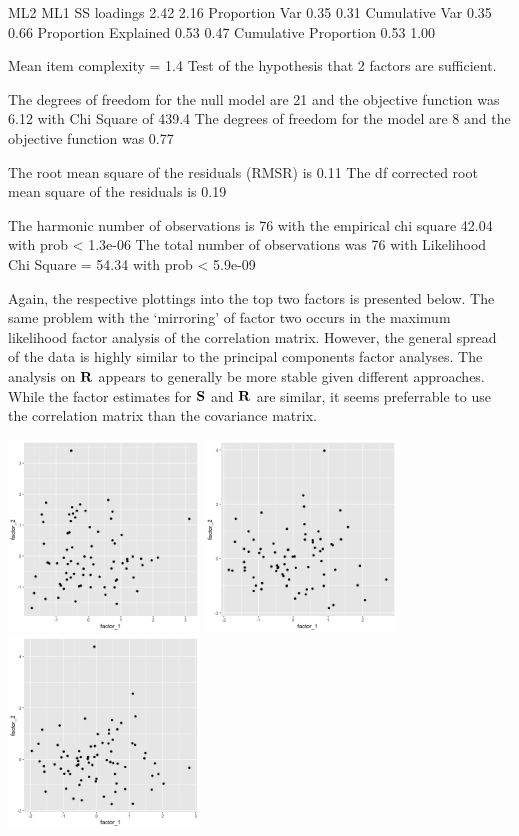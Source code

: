 \begin{rc}
                       ML2  ML1
SS loadings           2.42 2.16
Proportion Var        0.35 0.31
Cumulative Var        0.35 0.66
Proportion Explained  0.53 0.47
Cumulative Proportion 0.53 1.00

Mean item complexity =  1.4
Test of the hypothesis that 2 factors are sufficient.

The degrees of freedom for the null model are  21  and the objective function was  6.12 with Chi Square of  439.4
The degrees of freedom for the model are 8  and the objective function was  0.77 

The root mean square of the residuals (RMSR) is  0.11 
The df corrected root mean square of the residuals is  0.19 

The harmonic number of observations is  76 with the empirical chi square  42.04  with prob <  1.3e-06 
The total number of observations was  76  with Likelihood Chi Square =  54.34  with prob <  5.9e-09 

\end{rc}

Again, the respective plottings into the top two factors is presented below. The same problem with the `mirroring' of factor two occurs in the maximum likelihood factor analysis of the correlation matrix. However, the general spread of the data is highly similar to the principal components factor analyses. The analysis on $\mathrm{\bf{R}}$ appears to generally be more stable given different approaches. While the factor estimates for $\mathrm{\bf{S}}$ and $\mathrm{\bf{R}}$ are similar, it seems preferrable to use the correlation matrix than the covariance matrix.

\begin{center}
	\includegraphics[width=2in]{9_32_R_fa1.png}
	\includegraphics[width=2in]{9_32_R_fa2.png}
	\includegraphics[width=2in]{9_32_R_fa3.png}
\end{center}


